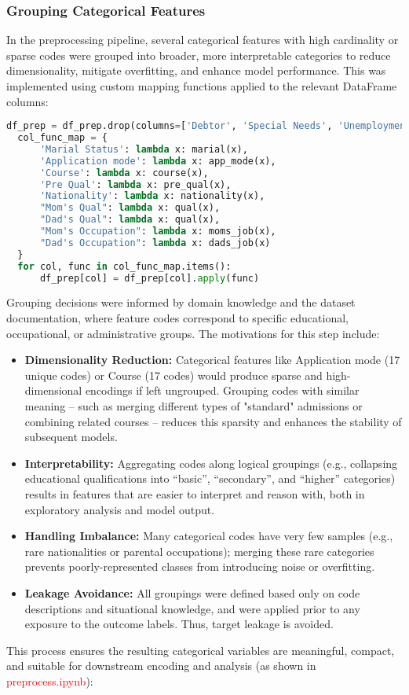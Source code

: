 \documentclass[twoside,final]{hcmut-report}
\begin{document}
\subsubsection*{Grouping Categorical Features}
In the preprocessing pipeline, several categorical features with high cardinality or sparse codes were grouped into broader, more interpretable categories to reduce dimensionality, mitigate overfitting, and enhance model performance. This was implemented using custom mapping functions applied to the relevant DataFrame columns:
\begin{lstlisting}[language=python]
  df_prep = df_prep.drop(columns=['Debtor', 'Special Needs', 'Unemployment rate', 'Inflation rate', 'GDP'])
  col_func_map = {
      'Marial Status': lambda x: marial(x),
      'Application mode': lambda x: app_mode(x),
      'Course': lambda x: course(x),
      'Pre Qual': lambda x: pre_qual(x),
      'Nationality': lambda x: nationality(x),
      "Mom's Qual": lambda x: qual(x),
      "Dad's Qual": lambda x: qual(x),
      "Mom's Occupation": lambda x: moms_job(x),
      "Dad's Occupation": lambda x: dads_job(x)
  }
  for col, func in col_func_map.items():
      df_prep[col] = df_prep[col].apply(func)
\end{lstlisting}
Grouping decisions were informed by domain knowledge and the dataset documentation, where feature codes correspond to specific educational, occupational, or administrative groups. The motivations for this step include:
\begin{itemize}
  \item \textbf{Dimensionality Reduction:} Categorical features like Application mode (17 unique codes) or Course (17 codes) would produce sparse and high-dimensional encodings if left ungrouped. Grouping codes with similar meaning -- such as merging different types of "standard" admissions or combining related courses -- reduces this sparsity and enhances the stability of subsequent models.
  \item \textbf{Interpretability:} Aggregating codes along logical groupings (e.g., collapsing educational qualifications into ``basic'', ``secondary'', and ``higher'' categories) results in features that are easier to interpret and reason with, both in exploratory analysis and model output.
  \item \textbf{Handling Imbalance:} Many categorical codes have very few samples (e.g., rare nationalities or parental occupations); merging these rare categories prevents poorly-represented classes from introducing noise or overfitting.
  \item \textbf{Leakage Avoidance:} All groupings were defined based only on code descriptions and situational knowledge, and were applied prior to any exposure to the outcome labels. Thus, target leakage is avoided.
\end{itemize}
This process ensures the resulting categorical variables are meaningful, compact, and suitable for downstream encoding and analysis (as shown in \textcolor{red}{preprocess.ipynb}):
\end{document}
